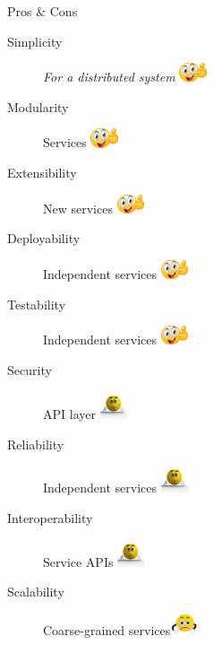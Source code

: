 \documentclass{slide}
\begin{document}
\begin{frame}{Pros \& Cons}
    \vspace{1mm}
    {\LARGE
    \begin{description}
        \item[Simplicity] \textit{For a distributed system} \tabto{15em}\includegraphics[width=8mm]{../../shared/images/thumbs-up.png}
        \item[Modularity] Services \tabto{15em}\includegraphics[width=8mm]{../../shared/images/thumbs-up.png}
        \item[Extensibility] New services \tabto{15em}\includegraphics[width=8mm]{../../shared/images/thumbs-up.png}
        \item[Deployability] Independent services \tabto{15em}\includegraphics[width=8mm]{../../shared/images/thumbs-up.png}
        \item[Testability] Independent services \tabto{15em}\includegraphics[width=8mm]{../../shared/images/thumbs-up.png}
        \item[Security] API layer \tabto{15em}\includegraphics[trim=57 145 70 85,clip,width=8mm]{../../shared/images/neutral.png}
        \item[Reliability] Independent services \tabto{15em}\includegraphics[trim=57 145 70 85,clip,width=8mm]{../../shared/images/neutral.png}
        \item[Interoperability] Service APIs \tabto{15em}\includegraphics[trim=57 145 70 85,clip,width=8mm]{../../shared/images/neutral.png}
        \item[Scalability] Coarse-grained services\tabto{15em}\includegraphics[trim=22 19 22 12,clip,width=8mm]{../../shared/images/thumbs-down.png}
    \end{description}
    }
\end{frame}
\end{document}
